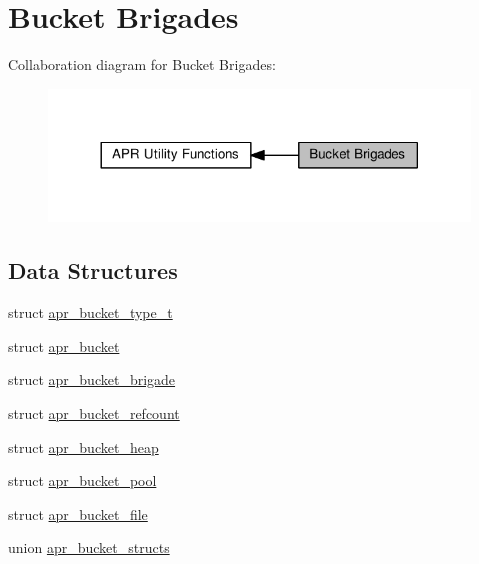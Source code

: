 \hypertarget{group__APR__Util__Bucket__Brigades}{}\section{Bucket Brigades}
\label{group__APR__Util__Bucket__Brigades}
Collaboration diagram for Bucket Brigades\+:
\nopagebreak
\begin{figure}[H]
\begin{center}
\leavevmode
\includegraphics[width=317pt]{group__APR__Util__Bucket__Brigades}
\end{center}
\end{figure}
\subsection*{Data Structures}
\begin{DoxyCompactItemize}
\item 
struct \hyperlink{structapr__bucket__type__t}{apr\+\_\+bucket\+\_\+type\+\_\+t}
\item 
struct \hyperlink{structapr__bucket}{apr\+\_\+bucket}
\item 
struct \hyperlink{structapr__bucket__brigade}{apr\+\_\+bucket\+\_\+brigade}
\item 
struct \hyperlink{structapr__bucket__refcount}{apr\+\_\+bucket\+\_\+refcount}
\item 
struct \hyperlink{structapr__bucket__heap}{apr\+\_\+bucket\+\_\+heap}
\item 
struct \hyperlink{structapr__bucket__pool}{apr\+\_\+bucket\+\_\+pool}
\item 
struct \hyperlink{structapr__bucket__file}{apr\+\_\+bucket\+\_\+file}
\item 
union \hyperlink{unionapr__bucket__structs}{apr\+\_\+bucket\+\_\+structs}
\end{DoxyCompactItemize}

